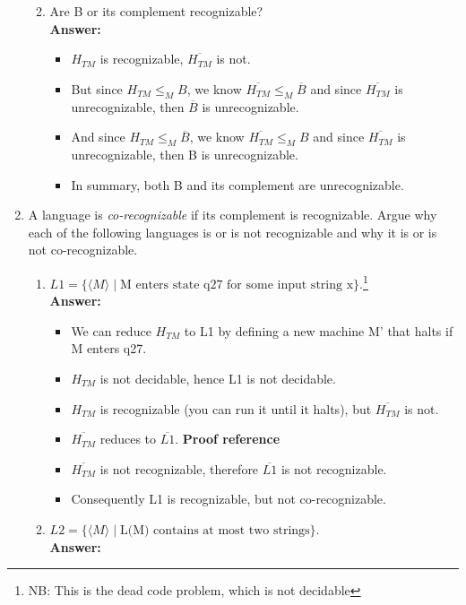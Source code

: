 \documentclass[12pt]{article}
\begin{document}
\begin{enumerate}
\begin{enumerate}
\begin{itemize}
			\end{itemize}
		\item Are B or its complement recognizable?
			\\[.2in]\textbf{Answer:}
			\begin{itemize}
			\item $H_{TM}$ is recognizable, $\overline{H_{TM}}$ is not.
			\item But since $H_{TM} \leq_{M}B$, we know $\overline{H_{TM}} \leq_{M} \overline{B}$ and since $\overline{H_{TM}}$ is unrecognizable, then $\overline{B}$ is unrecognizable.
			\item And since $H_{TM} \leq_{M} \overline{B}$, we know $\overline{H_{TM}} \leq_{M} B$ and since $\overline{H_{TM}}$ is unrecognizable, then B is unrecognizable.
			\item In summary, both B and its complement are unrecognizable.
			\end{itemize}
		\end{enumerate}
\newpage
	\item A language is \textit{co-recognizable} if its complement is recognizable. Argue why each of the following languages is or is not recognizable and why it is or is not co-recognizable.
		\begin{enumerate}
		\item $L1 = \{\langle M \rangle \mid \mbox{M enters state q27 for some input string x}\}$.\footnote{NB: This is the dead code problem, which is not decidable}
			\\[.2in]\textbf{Answer:}
			\begin{itemize}
			\item We can reduce $H_{TM}$ to L1 by defining a new machine M' that halts if M enters q27.
			\item $H_{TM}$ is not decidable, hence L1 is not decidable.
			\item $H_{TM}$ is recognizable (you can run it until it halts), but $\overline{H_{TM}}$ is not.
			\item $\overline{H_{TM}}$ reduces to $\overline{L1}$. \textbf{Proof reference}
			\item $\overline{H_{TM}}$ is not recognizable, therefore $\overline{L1}$ is not recognizable.
			\item Consequently L1 is recognizable, but not co-recognizable.
			\end{itemize}
		\item $L2 = \{\langle M \rangle \mid \mbox{L(M) contains at most two strings}\}$.
		\\[.2in]\textbf{Answer:}

\end{enumerate}
\end{enumerate}
\end{document}
